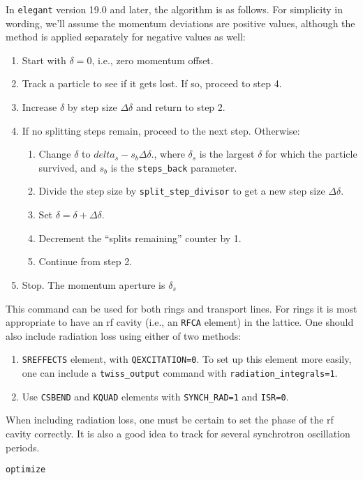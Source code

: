 \documentclass[11pt]{article}
\begin{document}
In {\tt elegant} version 19.0 and later, the algorithm is as follows.  For simplicity in
wording, we'll assume the momentum deviations are positive values,
although the method is applied separately for negative values as well:
\begin{enumerate}
\item Start with $\delta=0$, i.e., zero momentum offset.
\item Track a particle to see if it gets lost.  If so, proceed to step 4.
\item Increase $\delta$ by step size $\Delta\delta$ and return to step 2.
\item If no splitting steps remain, proceed to the next step.  Otherwise:
\begin{enumerate}
\item Change $\delta$ to $delta_s - s_b\Delta\delta$., where $\delta_s$ is
 the largest $\delta$ for which the particle survived, and $s_b$ is the
 \verb|steps_back| parameter.
\item Divide the step size by \verb|split_step_divisor| to get a new step size  $\Delta\delta$.
\item Set $\delta = \delta + \Delta\delta$.
\item Decrement the ``splits remaining'' counter by 1.
\item Continue from step 2.
\end{enumerate}
\item Stop.  The momentum aperture is $\delta_s$
\end{enumerate}

This command can be used for both rings and transport lines.  For
rings it is most appropriate to have an rf cavity (i.e., an {\tt RFCA}
element) in the lattice.  One should also include radiation loss using
either of two methods:
\begin{enumerate}
\item {\tt SREFFECTS} element, with {\tt QEXCITATION=0}.  To set up this element more easily, one
 can include a \verb|twiss_output| command with \verb|radiation_integrals=1|.
\item Use {\tt CSBEND} and {\tt KQUAD} elements with \verb|SYNCH_RAD=1| and \verb|ISR=0|.
\end{enumerate}
When including radiation loss, one must be certain to set the phase of the rf cavity
correctly.  It is also a good idea to track for several synchrotron oscillation periods.

\newpage
\begin{center}{\Large\verb|optimize|}\end{center}
\end{document}
